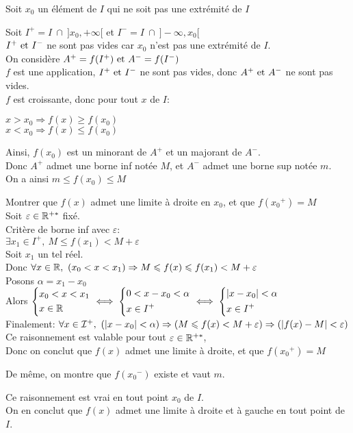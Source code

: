 \documentclass[12pt,twoside,a4paper]{article}
\begin{document}
		\begin{preuve}
			Soit $x_0$ un \'el\'ement de $I$ qui ne soit pas une extr\'emit\'e de $I$
			\begin{liste}
				\item Soit $I^{+}=I\ \cap\  ]x_0,+\infty[$ et $I^{-}=I\ \cap\  ]-\infty,x_0[$\\
					$I^{+}\text{ et } I^{-}$ ne sont pas vides car $x_0$ n'est pas une extr\'emit\'e de $I$.\\
					On consid\`ere $A^{+}=f(I^{+})\text{ et } A^{-}=f(I^{-})$\\
					$f$ est une application, $I^{+}\text{ et } I^{-}$ ne sont pas vides, donc $A^{+}\text{ et } A^{-}$ ne sont pas vides.\\
					$f$ est croissante, donc pour tout $x$ de $I$:
					\begin{tab}
						$x>x_0\Rightarrow f(x)\geqslant f(x_0)$\\
						$x<x_0\Rightarrow f(x)\leqslant f(x_0)$
					\end{tab}
					Ainsi, $f(x_0)$ est un minorant de $A^{+}$ et un majorant de $A^{-}$.\\
					Donc $A^{+}$ admet une borne inf not\'ee $M$, et $A^{-}$ admet une borne sup not\'ee $m$.\\
					On a ainsi $m\leqslant f(x_0)\leqslant M$
				\item Montrer que $f(x)$ admet une limite \`a droite en $x_0$, et que $f({x_0}^{+})=M$\\
					Soit $\varepsilon\in\mathbb{R}^{+*}$ fix\'e.\\
					Crit\`ere de borne inf avec $\varepsilon$:\\
					$\exists x_1\in I^{+},\ M\leqslant f(x_1) <M+\varepsilon$\\
					Soit $x_1$ un tel r\'eel.\\
					Donc $\forall x\in\R,\ (x_0<x<x_1)\Rightarrow M\leqslant f(x)\leqslant f(x_1)<M+\varepsilon$\\
					Posons $\alpha = x_1-x_0$\\
					Alors $\left\{\begin{aligned}& x_0<x<x_1\\& x\in\mathbb{R}\end{aligned}\right.\iff \left\{\begin{aligned}& 0<x-x_0<\alpha\\& x\in I^{+}\end{aligned}\right.\iff \left\{\begin{aligned}&|x-x_0|<\alpha\\& x\in I^{+}\end{aligned}\right.$\\
					Finalement: $\forall x\in\I^{+},\ (|x-x_0|<\alpha)\Rightarrow (M\leqslant f(x)<M+\varepsilon)\Rightarrow (|f(x)-M|<\varepsilon)$\\
					Ce raisonnement est valable pour tout $\varepsilon\in\mathbb{R}^{+*}$,\\
					Donc on conclut que $f(x)$ admet une limite \`a droite, et que $f({x_0}^{+})=M$
				\item De m\^eme, on montre que $f({x_0}^{-})$ existe et vaut $m$.
			\end{liste}
			Ce raisonnement est vrai en tout point $x_0$ de $I$.\\
			On en conclut que $f(x)$ admet une limite \`a droite et \`a gauche en tout point de $I$.
		\end{preuve}
\end{document}
